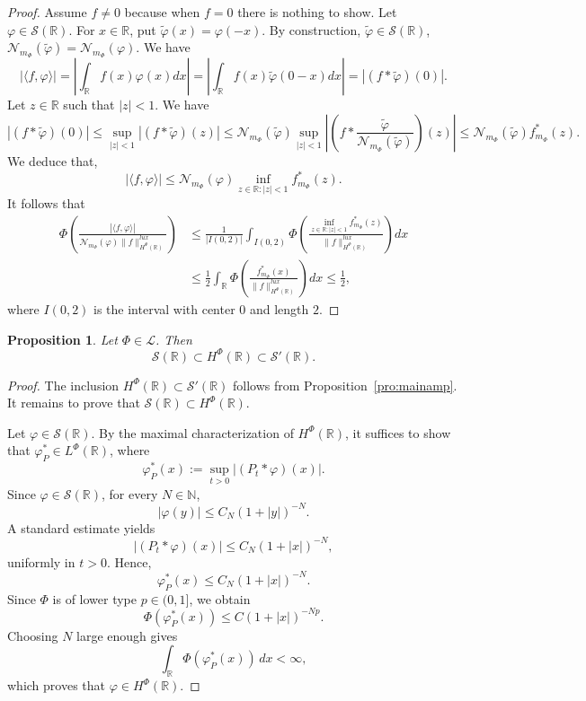 \documentclass[a4paper,12pt,intlimits,oneside]{amsart}
\newtheorem{proposition}[theorem]{Proposition}
\theoremstyle{definition}
\numberwithin{equation}{section}
\theoremstyle{definition}
\begin{document}
\begin{proof} 
Assume $f\not=0$ because when $f=0$ there is nothing to show.
Let  $\varphi \in \mathscr{S}(\mathbb{R})$. For $x \in \mathbb{R}$, put 
$\widetilde{\varphi}(x) =\varphi(-x).$
By construction,  $\widetilde{\varphi} \in \mathscr{S}(\mathbb{R})$,  $\mathcal{N}_{m_{\Phi}}(\widetilde{\varphi})=\mathcal{N}_{m_{\Phi}}(\varphi)$. We have
$$ |\langle f, \varphi\rangle|= \left|\int_{\mathbb{R}}f(x)\varphi(x)dx \right|=\left|\int_{\mathbb{R}}f(x)\widetilde{\varphi}(0-x)dx \right| =|(f\ast \widetilde{\varphi})(0)|.  $$
Let $z \in \mathbb{R}$ such that $|z| < 1$. We have
$$ |(f\ast \widetilde{\varphi})(0)| \leq \sup_{|z|<1}|(f\ast \widetilde{\varphi})(z)| \leq \mathcal{N}_{m_{\Phi}}(\widetilde{\varphi}) \sup_{|z|<1}\left|\left(f\ast \frac{\widetilde{\varphi}}{\mathcal{N}_{m_{\Phi}}(\widetilde{\varphi})}\right)(z)\right| \leq \mathcal{N}_{m_{\Phi}}(\widetilde{\varphi})f_{m_{\Phi}}^{*}(z). $$
We deduce that, 
$$  |\langle f, \varphi\rangle| \leq \mathcal{N}_{m_{\Phi}}(\varphi)\inf_{z \in \mathbb{R}:|z| < 1}f_{m_{\Phi}}^{*}(z). 
   $$
It follows that
\begin{align*}
\Phi\left(  \frac{|\langle f, \varphi\rangle|}{\mathcal{N}_{m_{\Phi}}(\varphi)\|f\|_{H^{\Phi}(\mathbb{R})}^{lux}}  \right) &\leq \frac{1}{|I(0,2)|}\int_{I(0,2)}\Phi\left(  \frac{\inf_{z \in \mathbb{R}:|z| < 1}f_{m_{\Phi}}^{*}(z)}{\|f\|_{H^{\Phi}(\mathbb{R})}^{lux}}  \right)dx  \\
 &\leq \frac{1}{2}\int_{\mathbb{R}}\Phi\left(  \frac{f_{m_{\Phi}}^{*}(x)}{\|f\|_{H^{\Phi}(\mathbb{R})}^{lux}}  \right)dx \leq \frac{1}{2},
\end{align*}
where $I(0,2)$ is the interval with center $0$ and length $2$. 
\end{proof} 


\begin{proposition}\label{pro:main2aaoamp}
Let $\Phi \in \mathscr{L}$.   Then
\[
\mathscr{S}(\mathbb{R}) \subset H^{\Phi}(\mathbb{R}) \subset \mathscr{S}'(\mathbb{R}).
\]
\end{proposition}


\begin{proof}
The inclusion $H^{\Phi}(\mathbb{R}) \subset \mathscr{S}'(\mathbb{R})$ follows from Proposition~\ref{pro:mainamp}. It remains to prove that $\mathscr{S}(\mathbb{R}) \subset H^{\Phi}(\mathbb{R})$.

Let $\varphi \in \mathscr{S}(\mathbb{R})$. By the maximal characterization of $H^{\Phi}(\mathbb{R})$, it suffices to show that $\varphi_P^* \in L^{\Phi}(\mathbb{R})$, where
\[
\varphi_P^*(x) := \sup_{t>0} |(P_t * \varphi)(x)|.
\]
Since $\varphi \in \mathscr{S}(\mathbb{R})$, for every $N \in \mathbb{N}$,
\[
|\varphi(y)| \le C_N (1+|y|)^{-N}.
\]
A standard estimate yields
\[
|(P_t * \varphi)(x)| \le C_N (1+|x|)^{-N},
\]
uniformly in $t>0$. Hence,
\[
\varphi_P^*(x) \le C_N (1+|x|)^{-N}.
\]
Since $\Phi$ is of lower type $p \in (0,1]$, we obtain
\[
\Phi(\varphi_P^*(x)) \le C (1+|x|)^{-Np}.
\]
Choosing $N$ large enough gives
\[
\int_{\mathbb{R}} \Phi(\varphi_P^*(x))\,dx < \infty,
\]
which proves that $\varphi \in H^{\Phi}(\mathbb{R})$.
\end{proof}
\medskip
\end{document}
